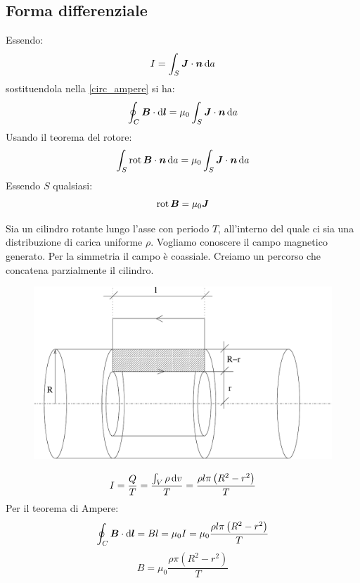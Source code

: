 \subsection{Forma differenziale}
Essendo:
\begin{equation*}I=\int_S\boldsymbol{J}\cdot\boldsymbol{n}\,\mathrm{d} a\end{equation*}
sostituendola nella \eqref{circ_ampere} si ha:
\begin{equation*}\oint_C \boldsymbol{B}\cdot\mathrm{d} \boldsymbol{l}=\mu_0\int_S\boldsymbol{J}\cdot\boldsymbol{n}\,\mathrm{d} a\end{equation*}
Usando il teorema del rotore:
\begin{equation*}\int_S\operatorname{rot}\boldsymbol{B}\cdot\boldsymbol{n}\,\mathrm{d} a=\mu_0\int_S\boldsymbol{J}\cdot\boldsymbol{n}\,\mathrm{d} a\end{equation*}
Essendo $S$ qualsiasi:
\begin{equation}
\operatorname{rot}\boldsymbol{B}=\mu_0\boldsymbol{J}
\end{equation}
\begin{Es}
Sia un cilindro rotante lungo l'asse con periodo $T$, all'interno del quale ci sia una distribuzione di carica uniforme $\rho$. Vogliamo conoscere il campo magnetico generato. Per la simmetria il campo è coassiale. Creiamo un percorso che concatena parzialmente il cilindro.
\begin{figure}[htbp]
\centering
\includegraphics[scale=0.4]{immagini/fisica2/cilindro_magnetico}
\end{figure}
\begin{equation*}I=\frac{Q}{T}=\frac{\int_V \rho\,\mathrm{d} v}{T}=\frac{\rho l\pi\left(R^2-r^2\right)}{T}\end{equation*}
Per il teorema di Ampere:
\begin{equation*}\oint_C \boldsymbol{B}\cdot\mathrm{d}\boldsymbol{l}=Bl=\mu_0 I=\mu_0\frac{\rho l\pi\left(R^2-r^2\right)}{T}\end{equation*}
\begin{equation*}B=\mu_0\frac{\rho\pi\left(R^2-r^2\right)}{T}\end{equation*}
\end{Es}


